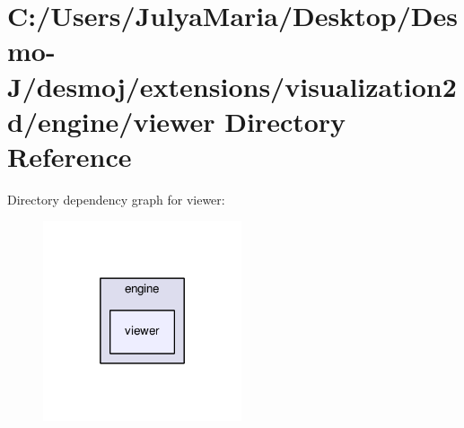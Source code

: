 \section{C\-:/\-Users/\-Julya\-Maria/\-Desktop/\-Desmo-\/\-J/desmoj/extensions/visualization2d/engine/viewer Directory Reference}
\label{dir_4d2a16d631abf0444075013f4ad8a7b9}
Directory dependency graph for viewer\-:
\nopagebreak
\begin{figure}[H]
\begin{center}
\leavevmode
\includegraphics[width=166pt]{dir_4d2a16d631abf0444075013f4ad8a7b9_dep}
\end{center}
\end{figure}
